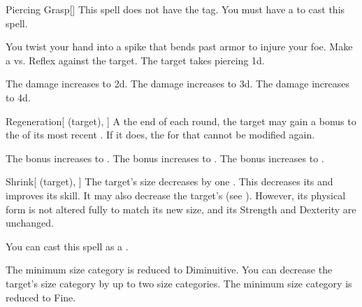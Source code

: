 \lowercase{\hypertarget{spell:Piercing Grasp}{}}\label{spell:Piercing Grasp}
\begin{freeability}[Rank 1]{\hypertarget{spell:Piercing Grasp}{Piercing Grasp}}[]
This spell does not have the  tag.
You must have a  to cast this spell.

You twist your hand into a spike that bends past armor to injure your foe.
Make a  vs. Reflex against the target.
\hit The target takes piercing  \plus1d.

\rankline
{} The damage increases to  \plus2d.
 The damage increases to  \plus3d.
 The damage increases to  \plus4d.
\end{freeability}
\vspace{0.25em}



\lowercase{\hypertarget{spell:Regeneration}{}}\label{spell:Regeneration}
\begin{attuneability}[Rank 1]{\hypertarget{spell:Regeneration}{Regeneration}}[ (target), ]
A the end of each round, the target may gain a  bonus to the  of its most recent .
If it does, the  for that  cannot be modified again.

\rankline
{} The bonus increases to .
 The bonus increases to .
 The bonus increases to .
\end{attuneability}
\vspace{0.25em}



\lowercase{\hypertarget{spell:Shrink}{}}\label{spell:Shrink}
\begin{attuneability}[Rank 1]{\hypertarget{spell:Shrink}{Shrink}}[ (target), ]
The target's size decreases by one .
This decreases its  and improves its  skill.
It may also decrease the target's  (see ).
However, its physical form is not altered fully to match its new size, and its Strength and Dexterity are unchanged.

You can cast this spell as a .

\rankline
{} The minimum size category is reduced to Diminuitive.
 You can decrease the target's size category by up to two size categories.
 The minimum size category is reduced to Fine.
\end{attuneability}
\vspace{0.25em}



